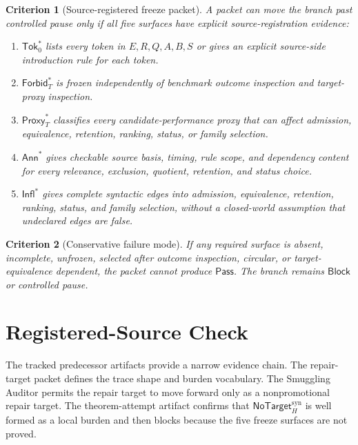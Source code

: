 \documentclass[11pt]{article}
\newcommand{\NoTargetSyn}{\mathsf{NoTarget}_{H}^{\mathrm{syn}}}
\newcommand{\SrcTok}{\mathsf{Tok}_{0}}
\newcommand{\ForbidT}{\mathsf{Forbid}_{T}}
\newcommand{\ProxyT}{\mathsf{Proxy}_{T}}
\newcommand{\Annot}{\mathsf{Ann}}
\newcommand{\Influence}{\mathsf{Infl}}
\newcommand{\Pass}{\mathsf{Pass}}
\newcommand{\Block}{\mathsf{Block}}
\newtheorem{criterion}{Criterion}
\begin{document}
\begin{criterion}[Source-registered freeze packet]
A packet can move the branch past controlled pause only if all five
surfaces have explicit source-registration evidence:
\begin{enumerate}
    \item \(\SrcTok^{*}\) lists every token in \(E,R,Q,A,B,S\) or gives an
    explicit source-side introduction rule for each token.
    \item \(\ForbidT^{*}\) is frozen independently of benchmark outcome
    inspection and target-proxy inspection.
    \item \(\ProxyT^{*}\) classifies every candidate-performance proxy that
    can affect admission, equivalence, retention, ranking, status, or family
    selection.
    \item \(\Annot^{*}\) gives checkable source basis, timing, rule scope,
    and dependency content for every relevance, exclusion, quotient,
    retention, and status choice.
    \item \(\Influence^{*}\) gives complete syntactic edges into admission,
    equivalence, retention, ranking, status, and family selection, without a
    closed-world assumption that undeclared edges are false.
\end{enumerate}
\end{criterion}

\begin{criterion}[Conservative failure mode]
If any required surface is absent, incomplete, unfrozen, selected after
outcome inspection, circular, or target-equivalence dependent, the packet
cannot produce \(\Pass\). The branch remains \(\Block\) or controlled pause.
\end{criterion}

\section{Registered-Source Check}

The tracked predecessor artifacts provide a narrow evidence chain. The
repair-target packet defines the trace shape and burden vocabulary. The
Smuggling Auditor permits the repair target to move forward only as a
nonpromotional repair target. The theorem-attempt artifact confirms that
\(\NoTargetSyn\) is well formed as a local burden and then blocks because
the five freeze surfaces are not proved.
\end{document}
